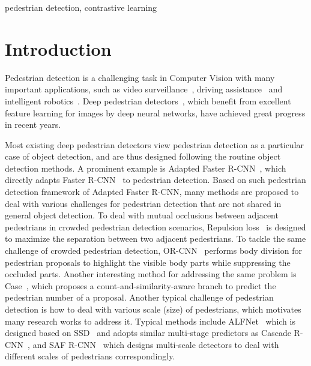 \documentclass[journal]{IEEEtran}
\begin{document}
\begin{IEEEkeywords}
pedestrian detection, contrastive learning
\end{IEEEkeywords}





\IEEEpeerreviewmaketitle

\section{Introduction}
Pedestrian detection is a challenging task in Computer Vision with many important applications, such as video surveillance~\cite{nascimento2006performance}, driving assistance~\cite{geiger2012we} and  intelligent robotics~\cite{geiger2013vision}.
Deep pedestrian detectors~\cite{ren2015faster,du2017fused,li2017scale,brazil2017illuminating,mao2017can,zhang2017citypersons,wang2018pcn,pang2019mask,song2020progressive,xie2020count,huang2020nms,wu2020temporal}, which benefit from excellent feature learning for images by deep neural networks, have achieved great progress in recent years.


Most existing deep pedestrian detectors view pedestrian detection as a particular case of object detection, and are thus designed following the routine object detection methods. A prominent example is Adapted Faster R-CNN~\cite{zhang2017citypersons}, which directly adapts Faster R-CNN~\cite{ren2016faster} to pedestrian detection. Based on such pedestrian detection framework of Adapted Faster R-CNN, many methods are proposed to deal with various challenges for pedestrian detection that are not shared in general object detection. To deal with mutual occlusions between adjacent pedestrians in crowded pedestrian detection scenarios,
Repulsion loss~\cite{wang2018repulsion} is designed to maximize the separation between two adjacent pedestrians. To tackle the same challenge of crowded pedestrian detection, OR-CNN~\cite{zhang2018occlusion} performs body division for pedestrian proposals to highlight the visible body parts while suppressing the occluded parts. Another interesting method for addressing the same problem is Case~\cite{xie2020count}, which proposes a count-and-similarity-aware branch to predict the pedestrian number of a proposal.
Another typical challenge of pedestrian detection is how to deal with various scale (size) of pedestrians, which motivates many research works to address it. Typical methods include ALFNet~\cite{liu2018learning} which is designed based on SSD~\cite{liu2016ssd} and adopts similar multi-stage predictors as Cascade R-CNN~\cite{cai2018cascade}, and SAF R-CNN~\cite{li2017scale} which designs multi-scale detectors to deal with different scales of pedestrians correspondingly.
\end{document}
